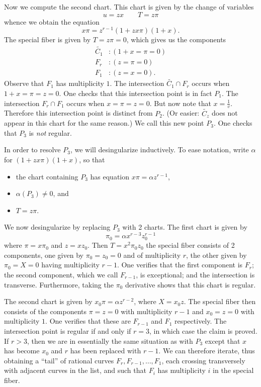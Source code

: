\documentclass{article}
\theoremstyle{plain}
\theoremstyle{definition}
\theoremstyle{remark}
\renewcommand{\tilde}[1]{\widetilde{#1}}
\begin{document}
Now we compute the second chart. This chart is given by the change of variables
\[
u=zx \qquad T=z\pi
\]
whence we obtain the equation
\[
x\pi = z^{r-1}(1 + zx\pi)(1 + x).
\]
The special fiber is given by $T = z\pi = 0$, which gives us the components
\begin{align*}
  \tilde{C_1}&: (1 + x = \pi = 0) \\
  F_r&: (z = \pi = 0) \\
  F_1&: (z = x = 0).
\end{align*}
Observe that $F_1$ has multiplicity $1$. The intersection $\tilde{C_1} \cap F_r$ occurs when $1 + x = \pi = z = 0$. One checks that this intersection point is in fact $P_1$. The intersection $F_r \cap F_1$ occurs when $x = \pi = z = 0$. But now note that $x = \frac{1}{v}$. Therefore this intersection point is distinct from $P_2$. (Or easier: $\tilde{C_z}$ does not appear in this chart for the same reason.) We call this new point $P_3$. One checks that $P_3$ is \emph{not} regular.

In order to resolve $P_3$, we will desingularize inductively. To ease notation, write $\alpha$ for $(1 + zx\pi)(1 + x)$, so that
\begin{itemize}
    \item the chart containing $P_3$ has equation $x\pi = \alpha z^{r-1}$,
    \item $\alpha(P_3) \neq 0$, and
    \item $T = z\pi$.
\end{itemize}

We now desingularize by replacing $P_3$ with 2 charts. The first chart is given by
\[
\pi_0 = \alpha x^{r-3} z_0^{r-1}
\]
where $\pi = x \pi_0$ and $z = x z_0$. Then $T = x^2 \pi_0 z_0$ the special fiber consists of 2 components, one given by $\pi_0 = z_0 = 0$ and of multiplicity $r$, the other given by $\pi_0 = X = 0$ having multiplicity $r-1$. One verifies that the first component is $F_r$; the second component, which we call $F_{r-1}$, is exceptional; and the intersection is transverse. Furthermore, taking the $\pi_0$ derivative shows that this chart is regular.

  The second chart is given by $x_0 \pi = \alpha z^{r-2}$, where $X = x_0 z$. The special fiber then consists of the components $\pi = z = 0$ with multiplicity $r-1$ and $x_0 = z = 0$ with multiplicity $1$. One verifies that these are $F_{r-1}$ and $F_1$ respectively. The intersection point is regular if and only if $r = 3$, in which case the claim is proved. If $r > 3$, then we are in essentially the same situation as with $P_3$ except that $x$ has become $x_0$ and $r$ has been replaced with $r-1$. We can therefore iterate, thus obtaining a ``tail'' of rational curves $F_r, F_{r-1}, \dots, F_1$, each crossing transversely with adjacent curves in the list, and such that $F_i$ has multiplicity $i$ in the special fiber.
\end{document}
